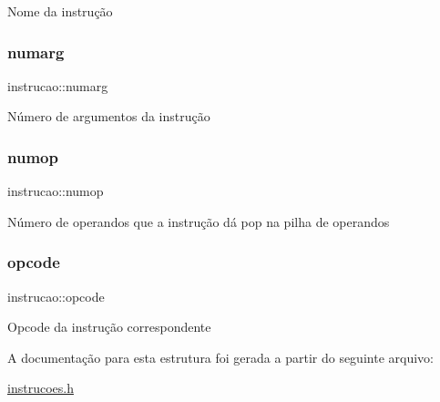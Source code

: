 Nome da instrução \mbox{\label{structinstrucao_abe29e9abb3acf6ab4f1b4690d31b456d}} 
\subsubsection{\texorpdfstring{numarg}{numarg}}
{\footnotesize\ttfamily instrucao\+::numarg}

Número de argumentos da instrução \mbox{\label{structinstrucao_ada3363067b90142344358001d51dd197}} 
\subsubsection{\texorpdfstring{numop}{numop}}
{\footnotesize\ttfamily instrucao\+::numop}

Número de operandos que a instrução dá pop na pilha de operandos \mbox{\label{structinstrucao_a588fa0d2c21e3de3d31382cdd08a3f6c}} 
\subsubsection{\texorpdfstring{opcode}{opcode}}
{\footnotesize\ttfamily instrucao\+::opcode}

Opcode da instrução correspondente 

A documentação para esta estrutura foi gerada a partir do seguinte arquivo\+:\begin{DoxyCompactItemize}
\item 
\hyperlink{instrucoes_8h}{instrucoes.\+h}\end{DoxyCompactItemize}
